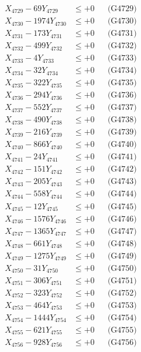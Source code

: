 \documentclass[a4paper,10pt]{article}
\begin{document}
{\begin{align}
X_{4729} - 69Y_{4729} &\leq +0 && \text{(G4729)} \\
X_{4730} - 1974Y_{4730} &\leq +0 && \text{(G4730)} \\
\allowbreak
X_{4731} - 173Y_{4731} &\leq +0 && \text{(G4731)} \\
X_{4732} - 499Y_{4732} &\leq +0 && \text{(G4732)} \\
X_{4733} - 4Y_{4733} &\leq +0 && \text{(G4733)} \\
X_{4734} - 32Y_{4734} &\leq +0 && \text{(G4734)} \\
X_{4735} - 322Y_{4735} &\leq +0 && \text{(G4735)} \\
X_{4736} - 294Y_{4736} &\leq +0 && \text{(G4736)} \\
X_{4737} - 552Y_{4737} &\leq +0 && \text{(G4737)} \\
X_{4738} - 490Y_{4738} &\leq +0 && \text{(G4738)} \\
X_{4739} - 216Y_{4739} &\leq +0 && \text{(G4739)} \\
X_{4740} - 866Y_{4740} &\leq +0 && \text{(G4740)} \\
\allowbreak
X_{4741} - 24Y_{4741} &\leq +0 && \text{(G4741)} \\
X_{4742} - 151Y_{4742} &\leq +0 && \text{(G4742)} \\
X_{4743} - 205Y_{4743} &\leq +0 && \text{(G4743)} \\
X_{4744} - 558Y_{4744} &\leq +0 && \text{(G4744)} \\
X_{4745} - 12Y_{4745} &\leq +0 && \text{(G4745)} \\
X_{4746} - 1576Y_{4746} &\leq +0 && \text{(G4746)} \\
X_{4747} - 1365Y_{4747} &\leq +0 && \text{(G4747)} \\
X_{4748} - 661Y_{4748} &\leq +0 && \text{(G4748)} \\
X_{4749} - 1275Y_{4749} &\leq +0 && \text{(G4749)} \\
X_{4750} - 31Y_{4750} &\leq +0 && \text{(G4750)} \\
\allowbreak
X_{4751} - 306Y_{4751} &\leq +0 && \text{(G4751)} \\
X_{4752} - 323Y_{4752} &\leq +0 && \text{(G4752)} \\
X_{4753} - 464Y_{4753} &\leq +0 && \text{(G4753)} \\
X_{4754} - 1444Y_{4754} &\leq +0 && \text{(G4754)} \\
X_{4755} - 621Y_{4755} &\leq +0 && \text{(G4755)} \\
X_{4756} - 928Y_{4756} &\leq +0 && \text{(G4756)} \\

\end{align}}
\end{document}
